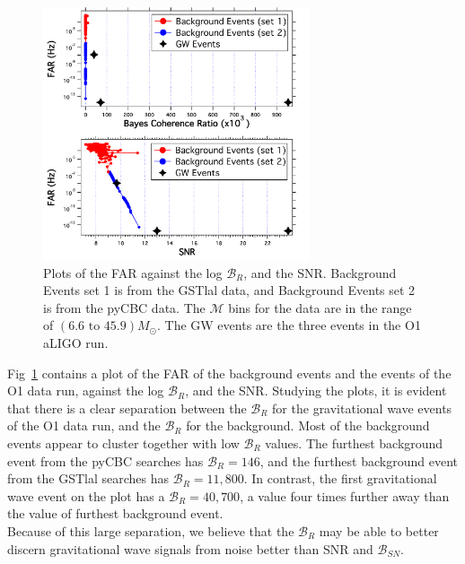 \documentclass{article}
\begin{document}
 
 
  
  \begin{figure}[h]
  	\centering
  	\includegraphics[width=0.7\textwidth]{Figures/eventsOnBackground.pdf} 
  	\caption{Plots of the FAR against the log $\mathcal{B}_{R}$, and the SNR. Background Events set 1 is from the GSTlal data, and Background Events set 2 is from the pyCBC data.  The $\mathcal{M}$ bins for the data are in the range of $(6.6  \text{ to } 45.9) M_{\odot}$. The GW events are the three events in the O1 aLIGO run.}
  	\label{Fig:eventsOnBackgroundFINAL}
  \end{figure}
  
 
  
  Fig~\ref{Fig:eventsOnBackgroundFINAL} contains a plot of the FAR of the background events and the events of the O1 data run, against the log  $\mathcal{B}_{R}$, and the SNR. Studying the plots, it is evident that there is a clear separation between the $\mathcal{B}_{R}$ for the gravitational wave events of the O1 data run, and the $\mathcal{B}_{R}$ for the background. Most of the background events appear to cluster together with low $\mathcal{B}_{R}$ values. The furthest background event from the pyCBC searches has $\mathcal{B}_{R} = 146$, and the furthest background event from the GSTlal searches has $\mathcal{B}_{R} = 11,800 $. In contrast, the first gravitational wave event on the plot has a $\mathcal{B}_{R}= 40,700$, a value four times further away than the value of furthest background event. \\
  
  Because of this large separation, we believe that the $\mathcal{B}_{R}$ may be able to better discern gravitational wave signals from noise better than SNR and $\mathcal{B}_{SN}$.
  
\end{document}
